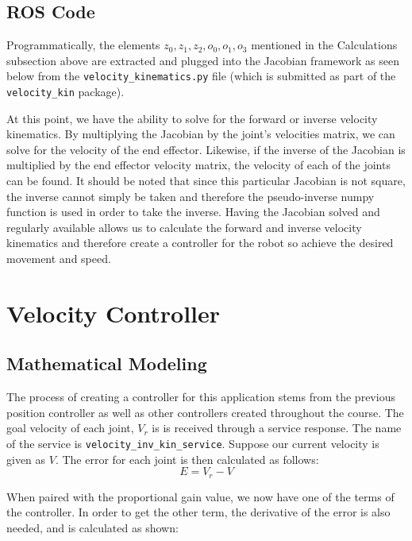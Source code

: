 \documentclass{article}
\begin{document}
\subsection{ROS Code}

Programmatically, the elements $z_0, z_1, z_2, o_0, o_1, o_3$ mentioned 
in the Calculations subsection above are extracted 
and plugged into the Jacobian framework as seen below from the 
\lstinline{velocity_kinematics.py} file (which is submitted as part of the 
\lstinline{velocity_kin} package).



At this point, we have the ability to solve for the forward or inverse velocity kinematics. By multiplying the Jacobian by the joint’s velocities matrix, we can solve for the velocity of the end effector. Likewise, if the inverse of the Jacobian is multiplied by the end effector velocity matrix, the velocity of each of the joints can be found. It should be noted that since this particular Jacobian is not square, the inverse cannot simply be taken and therefore the pseudo-inverse numpy function is used in order to take the inverse. Having the Jacobian solved and regularly available allows us to calculate the forward and inverse velocity kinematics and therefore create a controller for the robot so achieve the desired movement and speed.

\section{Velocity Controller}
\vspace{0.15in}
\subsection{Mathematical Modeling}
\vspace{0.15in}
The process of creating a controller for this application stems from the previous
position controller as well as other controllers created throughout the course.
The goal velocity of each joint, $V_r$ is is received through a service response.
The name of the service is \lstinline{velocity_inv_kin_service}. Suppose our current
velocity is given as $V$.
The error for each joint is then calculated as follows:
\[
    E = V_r - V
\]

When paired with the proportional gain value, we now have one of the terms of the controller. In order to get the other term, the derivative of the error is also needed, and is calculated as shown: 
\end{document}
